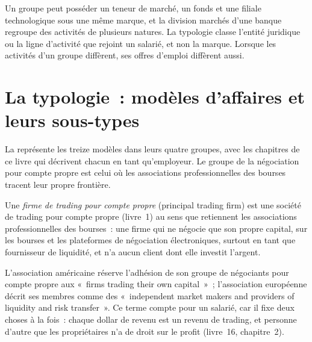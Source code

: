 \begin{remark}\label{rem:in:a-map-of-the-industry:groups}
Un groupe peut posséder un teneur de marché, un fonds et une filiale technologique sous une même marque, et la division marchés d'une banque
regroupe des activités de plusieurs natures. La typologie classe l'entité juridique ou la ligne d'activité que rejoint un salarié,
et non la marque. Lorsque les activités d'un groupe diffèrent, ses offres d'emploi diffèrent aussi.
\end{remark}

\section{La typologie~: modèles d'affaires et leurs sous-types}

La  représente les treize modèles dans leurs quatre groupes, avec les chapitres de ce livre
qui décrivent chacun en tant qu'employeur. Le groupe de la négociation pour compte propre est celui où les associations professionnelles des bourses tracent
leur propre frontière.

\begin{definition}\label{def:in:a-map-of-the-industry:ptf}
Une \emph{firme de trading pour compte propre} (principal trading firm) est une société de trading pour compte propre (livre~1) au sens
que retiennent les associations professionnelles des bourses~: une firme qui ne négocie que son propre capital, sur les bourses et les plateformes
de négociation électroniques, surtout en tant que fournisseur de liquidité, et n'a aucun client dont elle investit l'argent.
\end{definition}

L'association américaine réserve l'adhésion de son groupe de négociants pour compte propre aux «~firms trading their own
capital~»~; l'association européenne décrit ses membres comme des «~independent market makers and providers of liquidity
and risk transfer~». Ce terme compte pour un salarié, car il fixe deux choses à la fois~: chaque dollar de revenu est
un revenu de trading, et personne d'autre que les propriétaires n'a de droit sur le profit (livre~16, chapitre~2).

